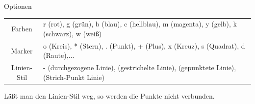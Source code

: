 \documentclass[hyperref={xetex}]{beamer}
\begin{document}
% 
% 
\begin{frame}[fragile]{Optionen}
\begin{tabular}{cp{8.5cm}}
\alert{ Farben} & r (rot), g (grün), b (blau), c (hellblau), m (magenta),
  y (gelb), k (schwarz), w (weiß)\\
\alert{ Marker} & o (Kreis), * (Stern), . (Punkt), + (Plus), x (Kreuz), s
  (Quadrat), d (Raute),... \\
\alert{ Linien-Stil} &  - (durchgezogene Linie), \imatlab{--} (gestrichelte
  Linie), \imatlab{:} (gepunktete Linie), \imatlab{-.} (Strich-Punkt Linie)\\
\end{tabular}

Läßt man den Linien-Stil weg, so werden die Punkte nicht verbunden.
\end{frame}
\end{document}
